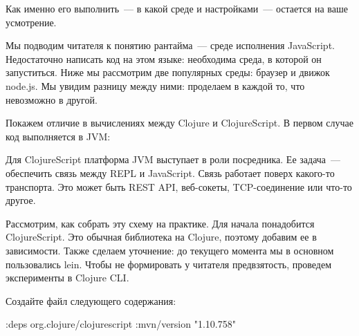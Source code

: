Как именно его выполнить~--- в какой среде и настройками~--- остается на ваше усмотрение.

Мы подводим читателя к понятию рантайма~--- среде исполнения JavaScript. Недостаточно написать код на этом языке: необходима среда, в которой он запуститься. Ниже мы рассмотрим две популярных среды: браузер и движок node.js. Мы увидим разницу между ними: проделаем в каждой то, что невозможно в другой.

Покажем отличие в вычислениях между Clojure и ClojureScript. В первом случае код выполняется в JVM:


Для ClojureScript платформа JVM выступает в роли посредника. Ее задача~--- обеспечить связь между REPL и JavaScript. Связь работает поверх какого-то транспорта. Это может быть REST API, веб-сокеты, TCP-соединение или что-то другое.


Рассмотрим, как собрать эту схему на практике. Для начала понадобится ClojureScript. Это обычная библиотека на Clojure, поэтому добавим ее в зависимости. Также сделаем уточнение: до текущего момента мы в основном пользовались lein. Чтобы не формировать у читателя предвзятость, проведем эксперименты в Clojure CLI.

Создайте файл  следующего содержания:

\begin{english}
  \begin{clojure}
{:deps
 {org.clojure/clojurescript {:mvn/version "1.10.758"}}}
  \end{clojure}
\end{english}


